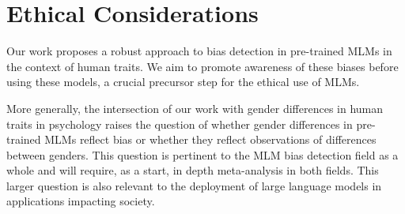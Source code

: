 \section{Ethical Considerations}

Our work proposes a robust approach to bias detection in pre-trained MLMs in the context of human traits. We aim to promote awareness of these biases before using these models, a crucial precursor step for the ethical use of MLMs.

More generally, the intersection of our work with gender differences in human traits in psychology raises the question of whether gender differences in pre-trained MLMs reflect bias or whether they reflect observations of differences between genders.
%
This question is pertinent to the MLM bias detection field as a whole and will require, as a start, in depth meta-analysis in both fields.
%
This larger question is also relevant to the deployment of large language models in applications impacting society.
